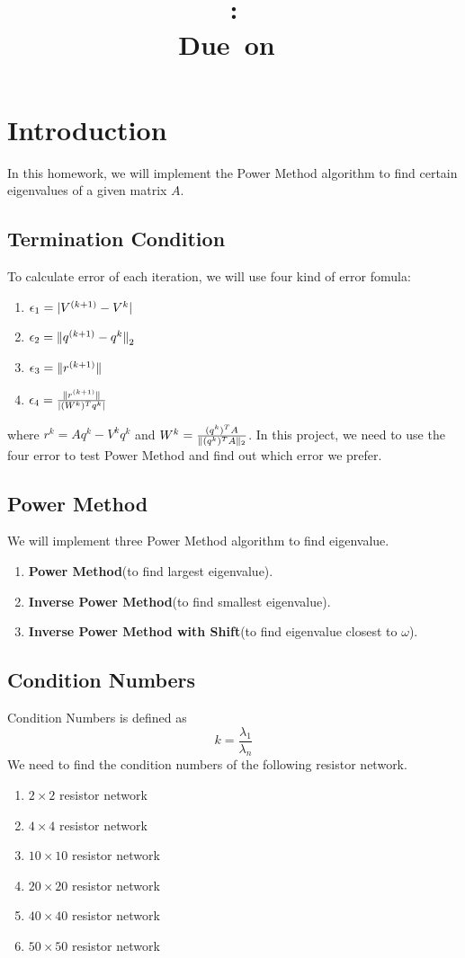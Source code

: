 \documentclass{article}
\title{
    \vspace{2in}
    \textmd{\textbf{\hmwkClass}}\\
    \textmd{\textbf{\hmwkID: \hmwkTitle}} \\
    \normalsize\vspace{0.1in}\small{Due\ on\ \hmwkDueDate}\\
    \vspace{3in}
}
\author{\textbf{\hmwkAuthorName}}
\date{} %
\DeclarePairedDelimiter{\norm}{\lVert}{\rVert}
\DeclarePairedDelimiter\abs{\lvert}{\rvert}%
\begin{document}
\maketitle
\newpage

\section{Introduction}
In this homework, we will implement the Power Method algorithm to find certain eigenvalues of a given matrix $A$.
\subsection{Termination Condition}
To calculate error of each iteration, we will use four kind of error fomula:
\begin{enumerate}
    \item $\epsilon_1 = \abs{{V^{(k+1)} - V^{k}}}$
    \item $\epsilon_2 = {\norm{q^{(k+1)} - q^k}}_2$
    \item $\epsilon_3 = \norm{r^{(k+1)}}$
    \item $\epsilon_4 = \frac{\norm{r^{(k+1)}}}{\abs{(W^k)^Tq^k}}$
\end{enumerate}
where $r^k = Aq^k - V^kq^k$ and $W^k = \frac{(q^k)^TA}{\norm{(q^k)^TA}_2}$. In this project, we need to use the four error to 
test Power Method and find out which error we prefer.

\subsection{Power Method}
We will implement three Power Method algorithm to find eigenvalue.
\begin{enumerate}
    \item \textbf{Power Method}(to find largest eigenvalue).
    \item \textbf{Inverse Power Method}(to find smallest eigenvalue).
    \item \textbf{Inverse Power Method with Shift}(to find eigenvalue closest to $\omega$).
\end{enumerate}

\subsection{Condition Numbers}
Condition Numbers is defined as
$$
    k = \frac{\lambda_1}{\lambda_n}
$$
We need to find the condition numbers of the following resistor network.
\begin{enumerate}
    \item $2 \times 2$ resistor network
    \item $4 \times 4$ resistor network
    \item $10 \times 10$ resistor network
    \item $20 \times 20$ resistor network
    \item $40 \times 40$ resistor network
    \item $50 \times 50$ resistor network
\end{enumerate}
\newpage
\end{document}

